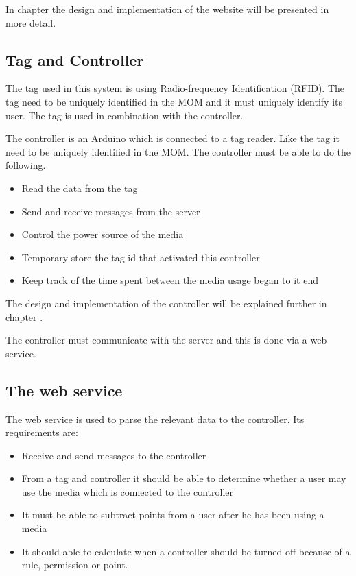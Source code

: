 In chapter  the design and implementation of the website will be presented in more detail. 
 

\subsection{Tag and Controller}
The tag used in this system is using Radio-frequency Identification (RFID). The tag need to be uniquely identified in the MOM and it must uniquely identify its user. The tag is used in combination with the controller.

The controller is an Arduino which is connected to a tag reader. Like the tag it need to be uniquely identified in the MOM. The controller must be able to do the following.

\begin{itemize}
	\item Read the data from the tag
	\item Send and receive messages from the server
	\item Control the power source of the media 
	\item Temporary store the tag id that activated this controller
	\item Keep track of the time spent between the media usage began to it end
\end{itemize}
 
The design and implementation of the controller will be explained further in chapter . 

The controller must communicate with the server and this is done via a web service.

\subsection{The web service}

The web service is used to parse the relevant data to the controller. Its requirements are:

\begin{itemize}
	\item Receive and send messages to the controller
	\item From a tag and controller it should be able to determine whether a user may use the media which is connected to the controller
	\item It must be able to subtract points from a user after he has been using a media
	\item It should able to calculate when a controller should be turned off because of a rule, permission or point.
\end{itemize}


